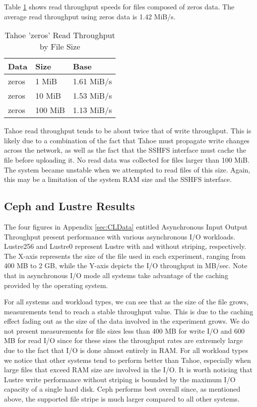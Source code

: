 \documentclass[11pt]{article}
\begin{document}
Table \ref{tbl:TahoeReadZeros} shows read throughput speeds for files
composed of zeros data. The average read throughput using
zeros data is 1.42 MiB/s.

\begin{table}
  \begin{center}
    \begin{tabularx}{\textwidth}{|X|X|X|}
      \hline
      {\bf Data} & {\bf Size} & {\bf Base} \\ \hline
      zeros & 1 MiB & 1.61 MiB/s \\ \hline
      zeros & 10 MiB & 1.53 MiB/s \\ \hline
      zeros & 100 MiB & 1.13 MiB/s \\ \hline
    \end{tabularx}
    \caption{Tahoe 'zeros' Read Throughput by File Size}
    \label{tbl:TahoeReadZeros}
  \end{center}
\end{table}

Tahoe read throughput tends to be about twice that of write
throughput. This is likely due to a combination of the fact that Tahoe
must propagate write changes across the network, as well as the fact
that the SSHFS interface must cache the file before uploading it. No
read data was collected for files larger than 100 MiB. The system
became unstable when we attempted to read files of this size. Again,
this may be a limitation of the system RAM size and the SSHFS interface.

\subsection{Ceph and Lustre Results}
The four figures in Appendix \ref{sec:CLData} entitled Asynchronous Input Output Throughput
present performance with various asynchronous I/O workloads. Lustre256 
and Lustre0 represent Lustre with and without striping, respectively. 
The X-axis represents the size of the file used in each experiment, 
ranging from 400 MB to 2 GB, while the Y-axis depicts the I/O throughput 
in MB/sec. Note that in asynchronous I/O mode all systems take advantage 
of the caching provided by the operating system.

For all systems and workload types, we can see that as the size 
of the file grows, measurements tend to reach a stable throughput value. This 
is due to the caching effect fading out as the size of the data involved in 
the experiment grows. We do not present measurements for file sizes less than 
400 MB for write I/O and 600 MB for read I/O since for these sizes the 
throughput rates are extremely large due to the fact that I/O is done almost 
entirely in RAM. For all workload types we notice that other systems tend to 
perform better than Tahoe, especially when large files that exceed RAM size 
are involved in the I/O. It is worth noticing that Lustre write performance 
without striping is bounded by the maximum I/O capacity of a single hard disk. 
Ceph performs best overall since, as mentioned above, the supported file stripe 
is much larger compared to all other systems.
\end{document}
